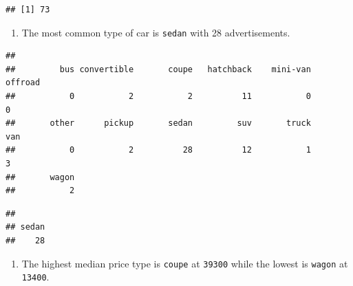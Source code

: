 \documentclass[
]{article}
\newenvironment{Shaded}{\begin{snugshade}}{\end{snugshade}}
\newcommand{\CommentTok}[1]{\textcolor[rgb]{0.56,0.35,0.01}{\textit{#1}}}
\newcommand{\DataTypeTok}[1]{\textcolor[rgb]{0.13,0.29,0.53}{#1}}
\newcommand{\DecValTok}[1]{\textcolor[rgb]{0.00,0.00,0.81}{#1}}
\newcommand{\KeywordTok}[1]{\textcolor[rgb]{0.13,0.29,0.53}{\textbf{#1}}}
\newcommand{\NormalTok}[1]{#1}
\newcommand{\OperatorTok}[1]{\textcolor[rgb]{0.81,0.36,0.00}{\textbf{#1}}}
\newcommand{\OtherTok}[1]{\textcolor[rgb]{0.56,0.35,0.01}{#1}}
\newcommand{\StringTok}[1]{\textcolor[rgb]{0.31,0.60,0.02}{#1}}
\providecommand{\tightlist}{%
  \setlength{\itemsep}{0pt}\setlength{\parskip}{0pt}}
\begin{document}
\begin{Shaded}
\end{Shaded}

\begin{verbatim}
## [1] 73
\end{verbatim}

\begin{enumerate}
\def\labelenumi{\arabic{enumi}.}
\setcounter{enumi}{1}
\tightlist
\item
  The most common type of car is \texttt{sedan} with 28 advertisements.
\end{enumerate}

\begin{Shaded}
\end{Shaded}

\begin{verbatim}
## 
##         bus convertible       coupe   hatchback    mini-van     offroad 
##           0           2           2          11           0           0 
##       other      pickup       sedan         suv       truck         van 
##           0           2          28          12           1           3 
##       wagon 
##           2
\end{verbatim}

\begin{Shaded}
\end{Shaded}

\begin{verbatim}
## 
## sedan 
##    28
\end{verbatim}

\begin{enumerate}
\def\labelenumi{\arabic{enumi}.}
\setcounter{enumi}{2}
\tightlist
\item
  The highest median price type is \texttt{coupe} at \texttt{39300}
  while the lowest is \texttt{wagon} at \texttt{13400}.
\end{enumerate}
\end{document}
